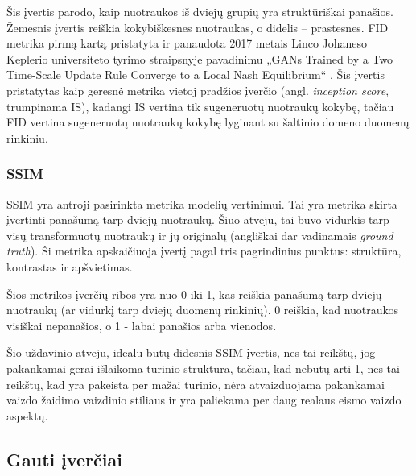 \documentclass{VUMIFPSbakalaurinis}
\begin{document}
            Šis įvertis parodo, kaip nuotraukos iš dviejų grupių yra struktūriškai panašios. Žemesnis įvertis reiškia kokybiškesnes nuotraukas, o didelis – prastesnes. FID metrika pirmą kartą pristatyta ir panaudota 2017 metais Linco Johaneso Keplerio universiteto tyrimo straipsnyje pavadinimu „GANs Trained by a Two Time-Scale Update Rule Converge to a Local Nash Equilibrium“ \cite{FidStart}. Šis įvertis pristatytas kaip geresnė metrika vietoj pradžios įverčio (angl. \emph{inception score}, trumpinama IS), kadangi IS vertina tik sugeneruotų nuotraukų kokybę, tačiau FID vertina sugeneruotų nuotraukų kokybę lyginant su šaltinio domeno duomenų rinkiniu.

        \subsubsection{SSIM}
            SSIM \cite{SSIM} yra antroji pasirinkta metrika modelių vertinimui. Tai yra metrika skirta įvertinti panašumą tarp dviejų nuotraukų. Šiuo atveju, tai buvo vidurkis tarp visų transformuotų nuotraukų ir jų originalų (angliškai dar vadinamais \emph{ground truth}). Ši metrika apskaičiuoja įvertį pagal tris pagrindinius punktus: struktūra, kontrastas ir apšvietimas.

            Šios metrikos įverčių ribos yra nuo 0 iki 1, kas reiškia panašumą tarp dviejų nuotraukų (ar vidurkį tarp dviejų duomenų rinkinių). 0 reiškia, kad nuotraukos visiškai nepanašios, o 1 - labai panašios arba vienodos.

            Šio uždavinio atveju, idealu būtų didesnis SSIM įvertis, nes tai reikštų, jog pakankamai gerai išlaikoma turinio struktūra, tačiau, kad nebūtų arti 1, nes tai reikštų, kad yra pakeista per mažai turinio, nėra atvaizduojama pakankamai vaizdo žaidimo vaizdinio stiliaus ir yra paliekama per daug realaus eismo vaizdo aspektų. 
        
   
    

    \subsection{Gauti įverčiai}
\end{document}
